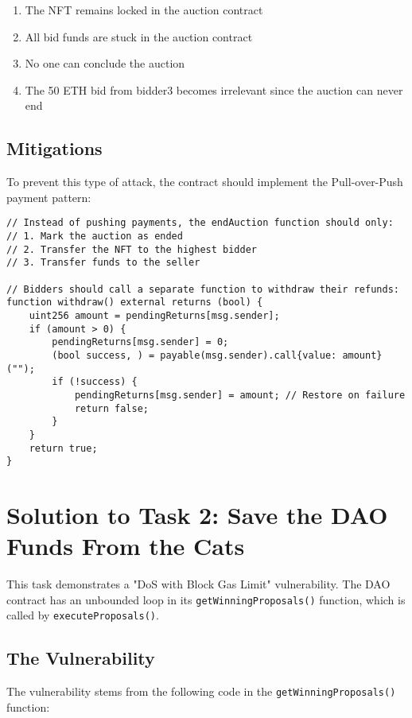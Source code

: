 \documentclass[12pt]{article}
\begin{document}
\begin{enumerate}
\item The NFT remains locked in the auction contract
\item All bid funds are stuck in the auction contract
\item No one can conclude the auction
\item The 50 ETH bid from bidder3 becomes irrelevant since the auction can never end
\end{enumerate}

\subsection*{Mitigations}

To prevent this type of attack, the contract should implement the Pull-over-Push payment pattern:

\begin{verbatim}
// Instead of pushing payments, the endAuction function should only:
// 1. Mark the auction as ended
// 2. Transfer the NFT to the highest bidder
// 3. Transfer funds to the seller

// Bidders should call a separate function to withdraw their refunds:
function withdraw() external returns (bool) {
    uint256 amount = pendingReturns[msg.sender];
    if (amount > 0) {
        pendingReturns[msg.sender] = 0;
        (bool success, ) = payable(msg.sender).call{value: amount}("");
        if (!success) {
            pendingReturns[msg.sender] = amount; // Restore on failure
            return false;
        }
    }
    return true;
}
\end{verbatim}

\section*{Solution to Task 2: Save the DAO Funds From the Cats}

This task demonstrates a "DoS with Block Gas Limit" vulnerability. The DAO contract has an unbounded loop in its \texttt{getWinningProposals()} function, which is called by \texttt{executeProposals()}.

\subsection*{The Vulnerability}

The vulnerability stems from the following code in the \texttt{getWinningProposals()} function:
\end{document}
